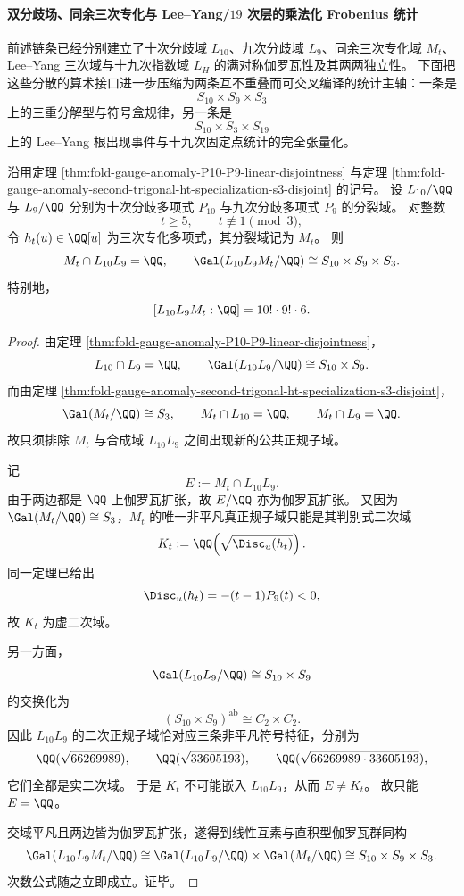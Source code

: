 \paragraph{双分歧场、同余三次专化与 Lee--Yang/\texorpdfstring{$19$}{19} 次层的乘法化 Frobenius 统计}
前述链条已经分别建立了十次分歧域 \(L_{10}\)、九次分歧域 \(L_9\)、同余三次专化域 \(M_t\)、Lee--Yang 三次域与十九次指数域 \(L_H\) 的满对称伽罗瓦性及其两两独立性。
下面把这些分散的算术接口进一步压缩为两条互不重叠而可交叉编译的统计主轴：一条是
\[
S_{10}\times S_9\times S_3
\]
上的三重分解型与符号盒规律，另一条是
\[
S_{10}\times S_3\times S_{19}
\]
上的 Lee--Yang 根出现事件与十九次固定点统计的完全张量化。

\begin{theorem}[双分歧场与同余三次专化场的三重直积伽罗瓦群]\label{thm:xi-time-part64bb-p10-p9-trigonal-threefold-galois-independence}
沿用定理 \ref{thm:fold-gauge-anomaly-P10-P9-linear-disjointness} 与定理
\ref{thm:fold-gauge-anomaly-second-trigonal-ht-specialization-s3-disjoint} 的记号。
设 \(L_{10}/\QQ\) 与 \(L_9/\QQ\) 分别为十次分歧多项式 \(P_{10}\) 与九次分歧多项式 \(P_9\) 的分裂域。
对整数
\[
t\ge 5,
\qquad
t\not\equiv 1\pmod 3,
\]
令 \(h_t(u)\in\QQ[u]\) 为三次专化多项式，其分裂域记为 \(M_t\)。
则
\[
M_t\cap L_{10}L_9=\QQ,
\qquad
\Gal(L_{10}L_9M_t/\QQ)\cong S_{10}\times S_9\times S_3.
\]
特别地，
\[
[L_{10}L_9M_t:\QQ]=10!\cdot 9!\cdot 6.
\]
\end{theorem}
\begin{proof}
由定理 \ref{thm:fold-gauge-anomaly-P10-P9-linear-disjointness}，
\[
L_{10}\cap L_9=\QQ,
\qquad
\Gal(L_{10}L_9/\QQ)\cong S_{10}\times S_9.
\]
而由定理 \ref{thm:fold-gauge-anomaly-second-trigonal-ht-specialization-s3-disjoint}，
\[
\Gal(M_t/\QQ)\cong S_3,
\qquad
M_t\cap L_{10}=\QQ,
\qquad
M_t\cap L_9=\QQ.
\]
故只须排除 \(M_t\) 与合成域 \(L_{10}L_9\) 之间出现新的公共正规子域。

记
\[
E:=M_t\cap L_{10}L_9.
\]
由于两边都是 \(\QQ\) 上伽罗瓦扩张，故 \(E/\QQ\) 亦为伽罗瓦扩张。
又因为 \(\Gal(M_t/\QQ)\cong S_3\)，\(M_t\) 的唯一非平凡真正规子域只能是其判别式二次域
\[
K_t:=\QQ\!\left(\sqrt{\Disc_u(h_t)}\right).
\]
同一定理已给出
\[
\Disc_u(h_t)=-(t-1)P_9(t)<0,
\]
故 \(K_t\) 为虚二次域。

另一方面，
\[
\Gal(L_{10}L_9/\QQ)\cong S_{10}\times S_9
\]
的交换化为
\[
(S_{10}\times S_9)^{\mathrm{ab}}\cong C_2\times C_2.
\]
因此 \(L_{10}L_9\) 的二次正规子域恰对应三条非平凡符号特征，分别为
\[
\QQ(\sqrt{66269989}),
\qquad
\QQ(\sqrt{33605193}),
\qquad
\QQ(\sqrt{66269989\cdot 33605193}),
\]
它们全都是实二次域。
于是 \(K_t\) 不可能嵌入 \(L_{10}L_9\)，从而 \(E\neq K_t\)。
故只能 \(E=\QQ\)。

交域平凡且两边皆为伽罗瓦扩张，遂得到线性互素与直积型伽罗瓦群同构
\[
\Gal(L_{10}L_9M_t/\QQ)\cong \Gal(L_{10}L_9/\QQ)\times \Gal(M_t/\QQ)
\cong S_{10}\times S_9\times S_3.
\]
次数公式随之立即成立。证毕。
\end{proof}

